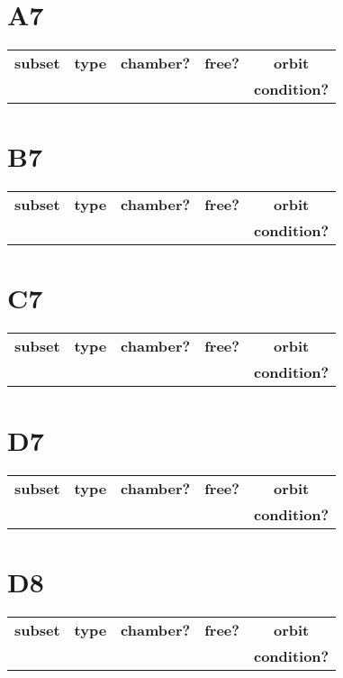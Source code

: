 \documentclass{article}
\newcommand{\resulttable}[1]{
  \section*{#1}
\begin{longtable}{llccc}
  \toprule
  \textbf{subset} & \textbf{type} & \textbf{chamber?} & \textbf{free?} & \textbf{orbit} \\
                  &               &                   &                & \textbf{condition?} \\
  \midrule
  
  \bottomrule
\end{longtable}
}
\begin{document}
\resulttable{A7}\newpage
\resulttable{B7}\newpage
\resulttable{C7}\newpage
\resulttable{D7}\newpage
\resulttable{D8}
\end{document}
